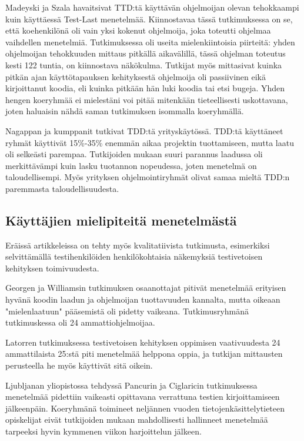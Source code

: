 \documentclass[finnish]{tktltiki2}
\theoremstyle{definition}
\theoremstyle{remark}
\begin{document}
Madeyski ja Szala \cite{Madeyski07} havaitsivat TTD:tä käyttävän ohjelmoijan olevan tehokkaampi kuin käyttäessä Test-Last menetelmää. Kiinnostavaa tässä tutkimuksessa on se, että koehenkilönä oli vain yksi kokenut ohjelmoija, joka toteutti ohjelmaa vaihdellen menetelmiä. Tutkimuksessa oli useita mielenkiintoisia piirteitä: yhden ohjelmoijan tehokkuuden mittaus pitkällä aikavälillä, tässä ohjelman toteutus kesti 122 tuntia, on kiinnostava näkökulma. Tutkijat myös mittasivat kuinka pitkän ajan käyttötapauksen kehityksestä ohjelmoija oli passiivinen eikä kirjoittanut koodia, eli kuinka pitkään hän luki koodia tai etsi bugeja. Yhden hengen koeryhmää ei mielestäni voi pitää mitenkään tieteellisesti uskottavana, joten haluaisin nähdä saman tutkimuksen isommalla koeryhmällä.

Nagappan ja kumppanit \cite{Nagappan08} tutkivat TDD:tä yrityskäytössä. TDD:tä käyttäneet ryhmät käyttivät 15\%-35\% enemmän aikaa projektin tuottamiseen, mutta laatu oli selkeästi parempaa. Tutkijoiden mukaan suuri parannus laadussa oli merkittävämpi kuin lasku tuotannon nopeudessa, joten menetelmä on taloudellisempi. Myös yrityksen ohjelmointiryhmät olivat samaa mieltä TDD:n paremmasta taloudellisuudesta.

\subsection{Käyttäjien mielipiteitä menetelmästä}

Eräissä artikkeleissa on tehty myös kvalitatiivista tutkimusta, esimerkiksi selvittämällä testihenkilöiden henkilökohtaisia näkemyksiä testivetoisen kehityksen toimivuudesta.

Georgen ja Williamsin \cite{George04} tutkimuksen osaanottajat pitivät menetelmää erityisen hyvänä koodin laadun ja ohjelmoijan tuottavuuden kannalta, mutta oikeaan "mielenlaatuun" pääsemistä oli pidetty vaikeana. Tutkimusryhmänä tutkimuskessa oli 24 ammattiohjelmoijaa.

Latorren \cite{Latorre14} tutkimuksessa testivetoisen kehityksen oppimisen vaativuudesta 24 ammattilaista 25:stä piti menetelmää helppona oppia, ja tutkijan mittausten perusteella he myös käyttivät sitä oikein.

Ljubljanan yliopistossa tehdyssä Pancurin ja Ciglaricin\cite{Pancur11} tutkimuksessa menetelmää pidettiin vaikeasti opittavana verrattuna testien kirjoittamiseen jälkeenpäin. Koeryhmänä toimineet neljännen vuoden tietojenkäsittelytieteen opiskelijat eivät tutkijoiden mukaan mahdollisesti hallinneet menetelmää tarpeeksi hyvin kymmenen viikon harjoittelun jälkeen.
\end{document}
